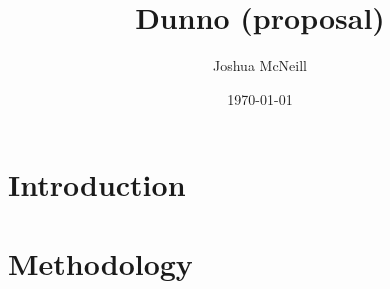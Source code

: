 \documentclass{article}
\title{Dunno (proposal)}
\author{Joshua McNeill}
\date{\today}
\begin{document}
  \maketitle
  \onehalfspacing
  \section{Introduction}

  \section{Methodology}

    \printbibliography
\end{document}
